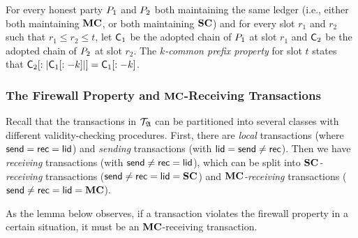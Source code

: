 \begin{definition}
  For every honest party $P_1$ and $P_2$
  both maintaining the same ledger (i.e., either both maintaining $\mathbf{MC}$, or both
  maintaining $\mathbf{SC}$) and for every slot $r_1$ and $r_2$ such that
  $r_1 \leq r_2 \leq t$, let $\mathsf{C}_1$ be the adopted chain of $P_1$ at
  slot $r_1$ and $\mathsf{C}_2$ be the adopted chain of $P_2$ at slot $r_2$.
  The \emph{$k$-common prefix property} for slot $t$ states
  that $\mathsf{C}_2[:|\mathsf{C}_1[:-k]|] = \mathsf{C}_1[:-k]$.
\end{definition}

\subsubsection{The Firewall Property and $\mathbf{MC}$-Receiving Transactions}

Recall that the transactions in $\mathcal{T}_{\mathfrak{A}}$ can be partitioned into several classes with
different validity-checking procedures. First, there are
\emph{local} transactions (where $\mathsf{send}=\mathsf{rec}=\mathsf{lid}$)
and
\emph{sending} transactions (with $\mathsf{lid}=\mathsf{send}\neq\mathsf{rec}$).
Then we have
\emph{receiving} transactions (with $\mathsf{send}\neq\mathsf{rec}=\mathsf{lid}$),
which can be split into
\emph{$\mathbf{SC}$-receiving} transactions ($\mathsf{send}\neq\mathsf{rec}=\mathsf{lid}=\mathbf{SC}$)
and
\emph{$\mathbf{MC}$-receiving} transactions ($\mathsf{send}\neq\mathsf{rec}=\mathsf{lid}=\mathbf{MC}$).

As the lemma below observes, if a transaction violates the firewall property in
a certain situation, it must be an $\mathbf{MC}$-receiving transaction.



